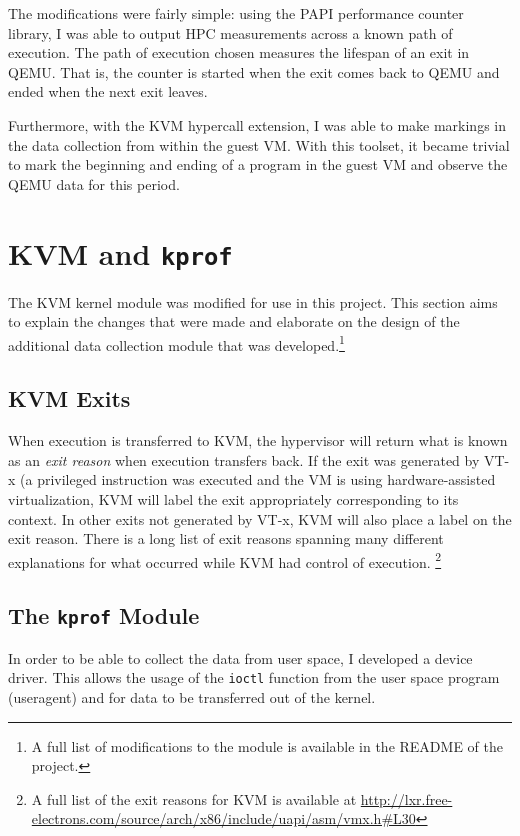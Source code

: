 \documentclass[notitlepage]{article}
\begin{document}
The modifications were fairly simple: using the PAPI performance counter
library, I was able to output HPC measurements across a known path of execution.
The path of execution chosen measures the lifespan of an exit in QEMU. That is,
the counter is started when the exit comes back to QEMU and ended when the next
exit leaves.

Furthermore, with the KVM hypercall extension, I was able to make markings in
the data collection from within the guest VM. With this toolset, it became
trivial to mark the beginning and ending of a program in the guest VM and
observe the QEMU data for this period.


\section{KVM and \texttt{kprof}}
\label{sec:kvm}
The KVM kernel module was modified for use in this project. This section aims to
explain the changes that were made and elaborate on the design of the additional
data collection module that was developed.\footnote{A full list of modifications
to the module is available in the README of the project.}

\subsection{KVM Exits}
When execution is transferred to KVM, the hypervisor will return what is known
as an \textit{exit reason} when execution transfers back. If the exit was
generated by VT-x (a privileged instruction was executed and the VM is using
hardware-assisted virtualization, KVM will label the exit appropriately
corresponding to its context. In other exits not generated by VT-x, KVM will
also place a label on the exit reason. There is a long list of exit reasons
spanning many different explanations for what occurred while KVM had control of
execution. \footnote{A full list of the exit reasons for KVM is available at
\url{http://lxr.free-electrons.com/source/arch/x86/include/uapi/asm/vmx.h\#L30}}

\subsection{The \texttt{kprof} Module}
In order to be able to collect the data from user space, I developed a device
driver. This allows the usage of the \texttt{ioctl} function from the user space
program (useragent) and for data to be transferred out of the kernel.
\end{document}
